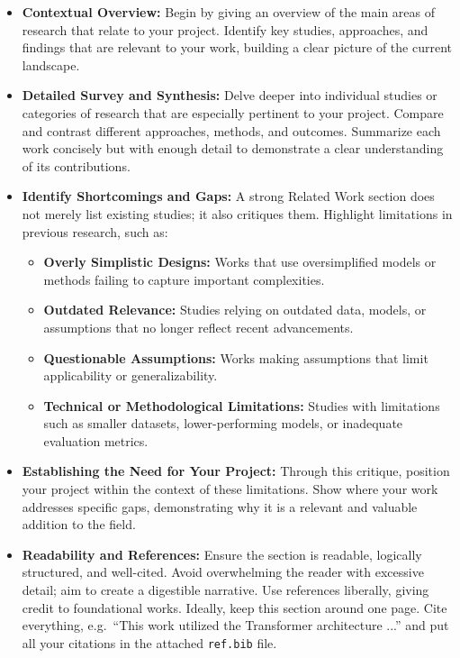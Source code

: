 \documentclass{article}
\begin{document}
\begin{itemize}
    \item \textbf{Contextual Overview:} Begin by giving an overview of the main areas of research that relate to your project. Identify key studies, approaches, and findings that are relevant to your work, building a clear picture of the current landscape.

    \item \textbf{Detailed Survey and Synthesis:} Delve deeper into individual studies or categories of research that are especially pertinent to your project. Compare and contrast different approaches, methods, and outcomes. Summarize each work concisely but with enough detail to demonstrate a clear understanding of its contributions.

    \item \textbf{Identify Shortcomings and Gaps:} A strong Related Work section does not merely list existing studies; it also critiques them. Highlight limitations in previous research, such as:
    \begin{itemize}
        \item \textbf{Overly Simplistic Designs:} Works that use oversimplified models or methods failing to capture important complexities.
        \item \textbf{Outdated Relevance:} Studies relying on outdated data, models, or assumptions that no longer reflect recent advancements.
        \item \textbf{Questionable Assumptions:} Works making assumptions that limit applicability or generalizability.
        \item \textbf{Technical or Methodological Limitations:} Studies with limitations such as smaller datasets, lower-performing models, or inadequate evaluation metrics.
    \end{itemize}

    \item \textbf{Establishing the Need for Your Project:} Through this critique, position your project within the context of these limitations. Show where your work addresses specific gaps, demonstrating why it is a relevant and valuable addition to the field.

    \item \textbf{Readability and References:} Ensure the section is readable, logically structured, and well-cited. Avoid overwhelming the reader with excessive detail; aim to create a digestible narrative. Use references liberally, giving credit to foundational works. Ideally, keep this section around one page. Cite everything, e.g.\ ``This work utilized the Transformer architecture \citep{vaswani2023attentionneed} ...'' and put all your citations in the attached \texttt{ref.bib} file.
\end{itemize}
\end{document}
